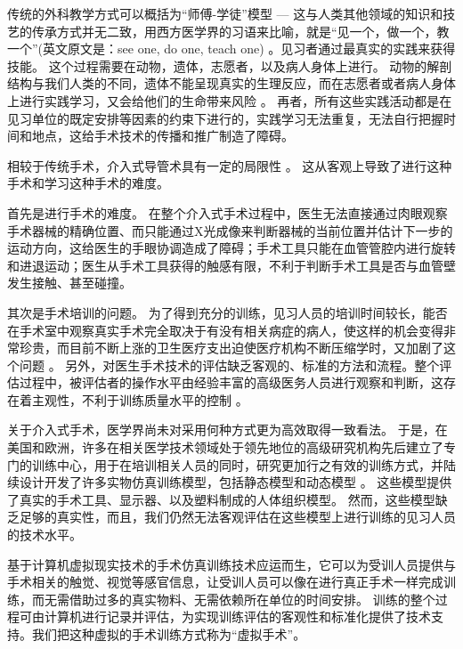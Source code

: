 传统的外科教学方式可以概括为“师傅-学徒”模型 --- 这与人类其他领域的知识和技艺的传承方式并无二致，用西方医学界的习语来比喻，就是“见一个，做一个，教一个”(英文原文是：see one, do one, teach one) \cite{Dawson1998}。见习者通过最真实的实践来获得技能。%
这个过程需要在动物，遗体，志愿者，以及病人身体上进行。
动物的解剖结构与我们人类的不同，遗体不能呈现真实的生理反应，而在志愿者或者病人身体上进行实践学习，又会给他们的生命带来风险 \cite{liu2003}。
再者，所有这些实践活动都是在见习单位的既定安排等因素的约束下进行的，实践学习无法重复，无法自行把握时间和地点，这给手术技术的传播和推广制造了障碍。

相较于传统手术，介入式导管术具有一定的局限性 \cite{basdogan2007}。
这从客观上导致了进行这种手术和学习这种手术的难度。

首先是进行手术的难度。
在整个介入式手术过程中，医生无法直接通过肉眼观察手术器械的精确位置、而只能通过X光成像来判断器械的当前位置并估计下一步的运动方向，这给医生的手眼协调造成了障碍；手术工具只能在血管管腔内进行旋转和进退运动；医生从手术工具获得的触感有限，不利于判断手术工具是否与血管壁发生接触、甚至碰撞。%

其次是手术培训的问题。
为了得到充分的训练，见习人员的培训时间较长，能否在手术室中观察真实手术完全取决于有没有相关病症的病人，使这样的机会变得非常珍贵，而目前不断上涨的卫生医疗支出迫使医疗机构不断压缩学时，又加剧了这个问题 \cite{liu2003}。
另外，对医生手术技术的评估缺乏客观的、标准的方法和流程。整个评估过程中，被评估者的操作水平由经验丰富的高级医务人员进行观察和判断，这存在着主观性，不利于训练质量水平的控制 \cite{basdogan2007}。%

关于介入式手术，医学界尚未对采用何种方式更为高效取得一致看法\cite{basdogan2007}。
于是，在美国和欧洲，许多在相关医学技术领域处于领先地位的高级研究机构先后建立了专门的训练中心，用于在培训相关人员的同时，研究更加行之有效的训练方式，并陆续设计开发了许多实物仿真训练模型，包括静态模型和动态模型 \cite{Cooper2004Review}。%
这些模型提供了真实的手术工具、显示器、以及塑料制成的人体组织模型。
然而，这些模型缺乏足够的真实性，而且，我们仍然无法客观评估在这些模型上进行训练的见习人员的技术水平。

基于计算机虚拟现实技术的手术仿真训练技术应运而生，它可以为受训人员提供与手术相关的触觉、视觉等感官信息，让受训人员可以像在进行真正手术一样完成训练，而无需借助过多的真实物料、无需依赖所在单位的时间安排。
训练的整个过程可由计算机进行记录并评估，为实现训练评估的客观性和标准化提供了技术支持。我们把这种虚拟的手术训练方式称为“虚拟手术”。


